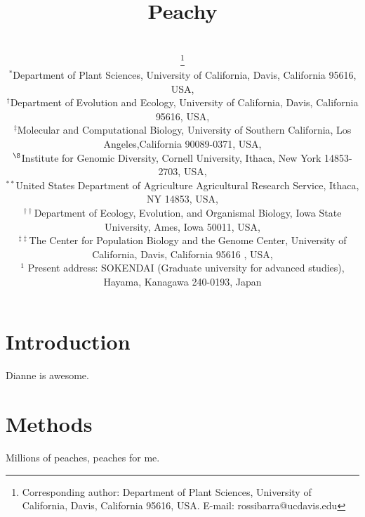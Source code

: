 \documentclass[12pt]{article}
\begin{document}
\title{Peachy}
\author{
 \small{}\\
   \small{}\thanks{
Corresponding author:  Department of Plant Sciences, University of California, Davis, California 95616, USA. 
    E-mail: \mbox{rossibarra@ucdavis.edu}}\\[0.3cm]
   \small\sf $^{\ast}$Department of Plant Sciences, University of California, Davis, California 95616, USA,\\
   \small\sf $^\dag$Department of Evolution and Ecology, University of California, Davis, California 95616, USA,\\
   \small\sf $^\ddag$Molecular and Computational Biology, University of Southern California,  Los Angeles,California 90089-0371, USA,\\
   \small\sf $^\S$Institute for Genomic Diversity, Cornell University, Ithaca, New York 14853-2703, USA,\\
   \small\sf $^{\ast\ast}$United States Department of Agriculture Agricultural Research Service, Ithaca,
NY 14853, USA,\\
   \small\sf $^{\dag\dag}$Department of Ecology, Evolution, and Organismal Biology, Iowa State University, Ames, Iowa 50011, USA,\\
   \small\sf $^{\ddag\ddag}$The Center for Population Biology and the Genome Center, University of California, Davis, California 95616 , USA,\\
   \small\sf $^1$ Present address: SOKENDAI (Graduate university for advanced studies), Hayama, Kanagawa 240-0193, Japan
}

\maketitle

\section*{Introduction}
Dianne is awesome.

\section*{Methods}
Millions of peaches, peaches for me.
\end{document}
